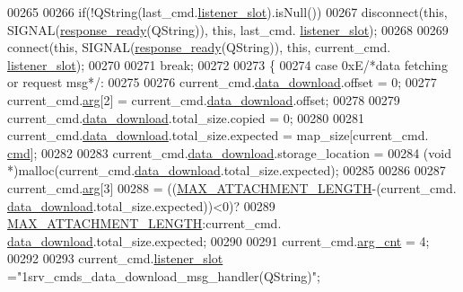 \begin{DoxyCode}
00265 
00266             \textcolor{keywordflow}{if}(!QString(last\_cmd.\hyperlink{a00001_abb76d8edb39876deb60975c8fd784b3f}{listener\_slot}).isNull())
00267             disconnect(\textcolor{keyword}{this}, SIGNAL(\hyperlink{a00006_a3f6396874778799cf07a7a0149e54977}{response\_ready}(QString)), \textcolor{keyword}{this}, last\_cmd.
      \hyperlink{a00001_abb76d8edb39876deb60975c8fd784b3f}{listener\_slot});
00268 
00269             connect(\textcolor{keyword}{this}, SIGNAL(\hyperlink{a00006_a3f6396874778799cf07a7a0149e54977}{response\_ready}(QString)), \textcolor{keyword}{this}, current\_cmd.
      \hyperlink{a00001_abb76d8edb39876deb60975c8fd784b3f}{listener\_slot});
00270 
00271         \textcolor{keywordflow}{break};
00272 
00273    \{
00274     \textcolor{keywordflow}{case} 0xE\textcolor{comment}{/*data fetching or request msg*/}:
00275 
00276             current\_cmd.\hyperlink{a00001_a5cfeaed4d4f8e51070a324c0ba893ebe}{data\_download}.offset = 0;
00277             current\_cmd.\hyperlink{a00001_a56e6c2d7315d0ae60a51e8b140c9cfe4}{arg}[2] = current\_cmd.\hyperlink{a00001_a5cfeaed4d4f8e51070a324c0ba893ebe}{data\_download}.offset;
00278 
00279             current\_cmd.\hyperlink{a00001_a5cfeaed4d4f8e51070a324c0ba893ebe}{data\_download}.total\_size.copied = 0;
00280 
00281             current\_cmd.\hyperlink{a00001_a5cfeaed4d4f8e51070a324c0ba893ebe}{data\_download}.total\_size.expected = map\_size[current\_cmd.
      \hyperlink{a00001_af20664dc9ca2b752c73d524edee0e07a}{cmd}];
00282 
00283             current\_cmd.\hyperlink{a00001_a5cfeaed4d4f8e51070a324c0ba893ebe}{data\_download}.storage\_location =
00284                     (\textcolor{keywordtype}{void} *)malloc(current\_cmd.\hyperlink{a00001_a5cfeaed4d4f8e51070a324c0ba893ebe}{data\_download}.total\_size.expected);
00285 
00286 
00287             current\_cmd.\hyperlink{a00001_a56e6c2d7315d0ae60a51e8b140c9cfe4}{arg}[3]
00288                     = ((\hyperlink{a00031_aa8abe3a822c64813f7aaba3ca7e3db9c}{MAX\_ATTACHMENT\_LENGTH}-(current\_cmd.
      \hyperlink{a00001_a5cfeaed4d4f8e51070a324c0ba893ebe}{data\_download}.total\_size.expected))<0)?
00289                         \hyperlink{a00031_aa8abe3a822c64813f7aaba3ca7e3db9c}{MAX\_ATTACHMENT\_LENGTH}:current\_cmd.
      \hyperlink{a00001_a5cfeaed4d4f8e51070a324c0ba893ebe}{data\_download}.total\_size.expected;
00290 
00291             current\_cmd.\hyperlink{a00001_affcea772a1bc5362ebbc274b6166f81b}{arg\_cnt}    = 4;
00292 
00293             current\_cmd.\hyperlink{a00001_abb76d8edb39876deb60975c8fd784b3f}{listener\_slot} =\textcolor{stringliteral}{"1srv\_cmds\_data\_download\_msg\_handler(QString)"};

\end{DoxyCode}
